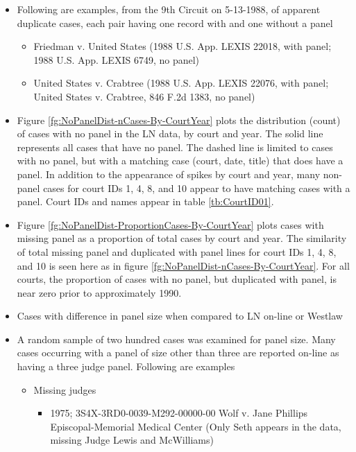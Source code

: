 \documentclass[10pt, letterpaper]{article}
\begin{document}
\begin{spacing}{1.0}
\begin{itemize}
\begin{itemize}
        \item Following are examples, from the 9th Circuit on 5-13-1988, of apparent duplicate cases, each pair having one record with and one without a panel
        \begin{itemize}
            \item Friedman v. United States (1988 U.S. App. LEXIS 22018, with panel; 1988 U.S. App. LEXIS 6749, no panel)
            \item United States v. Crabtree (1988 U.S. App. LEXIS 22076, with panel; United States v. Crabtree, 846 F.2d 1383, no panel)
        \end{itemize}
        
        \item Figure \ref{fg:NoPanelDist-nCases-By-CourtYear} plots the distribution (count) of cases with no panel in the LN data, by court and year.  The solid line represents all cases that have no panel.  The dashed line is limited to cases with no panel, but with a matching case (court, date, title) that does have a panel.  In addition to the appearance of spikes by court and year, many non-panel cases for court IDs 1, 4, 8, and 10 appear to have matching cases with a panel.  Court IDs and names appear in table \ref{tb:CourtID01}.
        
        \item Figure \ref{fg:NoPanelDist-ProportionCases-By-CourtYear} plots cases with missing panel as a proportion of total cases by court and year.  The similarity of total missing panel and duplicated with panel lines for court IDs 1, 4, 8, and 10 is seen here as in figure \ref{fg:NoPanelDist-nCases-By-CourtYear}.  For all courts, the proportion of cases with no panel, but duplicated with panel, is near zero prior to approximately 1990.
        
        \item Cases with difference in panel size when compared to LN on-line or Westlaw
              
        \item A random sample of two hundred cases was examined for panel size. Many cases occurring with a panel of size other than three are reported on-line as having a three judge panel. Following are examples
        \begin{itemize}
            \item  Missing judges
            \begin{itemize}
                \item 1975; 3S4X-3RD0-0039-M292-00000-00 Wolf v. Jane Phillips Episcopal-Memorial Medical Center 
                (Only Seth appears in the data, missing Judge Lewis and McWilliams)
                

\end{itemize}
\end{itemize}
\end{itemize}
\end{itemize}
\end{spacing}
\end{document}
